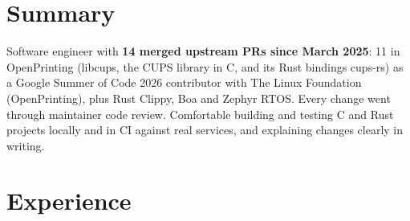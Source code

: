 \documentclass[10pt]{article}
\begin{document}

\section*{Summary}
Software engineer with \textbf{14 merged upstream PRs since March 2025}: 11 in OpenPrinting (libcups, the CUPS library in C, and its Rust bindings cups-rs) as a Google Summer of Code 2026 contributor with The Linux Foundation (OpenPrinting), plus Rust Clippy, Boa and Zephyr RTOS. Every change went through maintainer code review. Comfortable building and testing C and Rust projects locally and in CI against real services, and explaining changes clearly in writing.

\section*{Experience}
\end{document}
